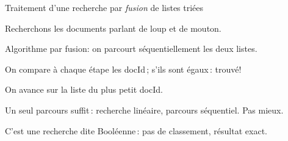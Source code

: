 \begin{frame}{Traitement d'une recherche par \emph{fusion} de listes triées}

Recherchons les documents parlant de loup et de mouton.

\vfill

Algorithme par \alert{fusion}: on parcourt \alert{séquentiellement} les deux listes.

\smallskip

On compare à chaque étape les docId\,; s'ils sont égaux\,: \alert{trouvé}!

\smallskip

On avance sur la liste du plus petit docId.


\pause
\vfill

\alert{Un seul parcours suffit}\,: recherche linéaire, parcours séquentiel. Pas mieux.

\vfill

 C'est une recherche dite \alert{Booléenne}\,: pas de classement, résultat exact.
 
 
 
\end{frame}


